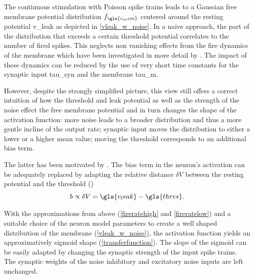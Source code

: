 The continuous stimulation with Poisson spike trains leads to a Gaussian free membrane potential distribution $f_{\gls{v_mem}}$ centered around the resting potential \gls{v_leak} as depicted in \cref{vleak_w_noise}. In a naive approach, the part of the distribution that exceeds a certain threshold potential correlates to the number of fired spikes. This neglects non vanishing effects from the fire dynamics of the membrane which have been investigated in more detail by \citealp{petrovici12phdthesis}. The impact of these dynamics can be reduced by the use of very short time constants for the synaptic input \gls{tau_syn} and the membrane \gls{tau_m}.

However, despite the strongly simplified picture, this view still offers a correct intuition of how the threshold and leak potential as well as the strength of the noise effect the free membrane potential and in turn changes the shape of the activation function: more noise leads to a broader distribution and thus a more gentle incline of the output rate; synaptic input moves the distribution to either a lower or a higher mean value; moving the threshold corresponds to an additional bias term.

The latter has been motivated by \citealp{petrovici2016stochastic}. The bias term in the neuron's activation can be adequately replaced by adapting the relative distance $\delta V$ between the resting potential and the threshold (\citealp{petrovici2016stochastic})
\begin{equation}
b \propto \delta V = \gls{v_leak} - \gls{thres}.
\end{equation}

With the approximations from above (\cref{fireratehigh} and \cref{fireratelow}) and a suitable choice of the neuron model parameters to create a well shaped distribution of the membrane (\cref{vleak_w_noise}), the activation function yields an approximatively sigmoid shape (\cref{transferfunction}). The slope of the sigmoid can be easily adapted by changing the synaptic strength of the input spike trains. The synaptic weights of the noise inhibitory and excitatory noise inputs are left unchanged.

